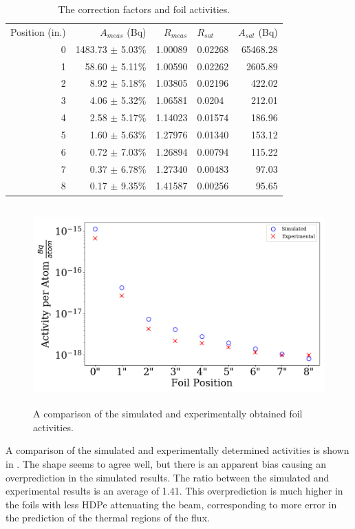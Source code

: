 \begin{table}[h]\centering
\label{tab:a_sat}
\caption{The correction factors and foil activities.}
\begin{tabular}{ r | r | r | l | r }
\toprule
Position (in.)  & $A_{meas}$ (Bq) & $R_{meas}$  & $R_{sat}$   &   $A_{sat}$  (Bq)\\
0 & 1483.73 $\pm$ 5.03\% & 1.00089 & 0.02268 & 65468.28 \\
1 & 58.60 $\pm$ 5.11\% & 1.00590 & 0.02262 &  2605.89  \\
2 & 8.92 $\pm$ 5.18\% & 1.03805 & 0.02196 &   422.02  \\
3 & 4.06 $\pm$ 5.32\% & 1.06581 & 0.0204  &   212.01  \\
4 & 2.58 $\pm$ 5.17\% & 1.14023 & 0.01574  &   186.96  \\
5 & 1.60 $\pm$ 5.63\% & 1.27976 & 0.01340 &      153.12  \\
6 & 0.72 $\pm$ 7.03\% & 1.26894 & 0.00794 &       115.22  \\
7 & 0.37 $\pm$ 6.78\% & 1.27340 & 0.00483 &      97.03   \\
8 & 0.17 $\pm$ 9.35\% & 1.41587 & 0.00256 &       95.65\\
\end{tabular}
\end{table}

\begin{figure}[htb]
\centering
\includegraphics[height=3in]{tex/figures/compare_activities.png}
\caption[Foil Activities]{A comparison of the simulated and experimentally obtained foil activities.}
\label{fig:compare_activities}
\end{figure}

A comparison of the simulated and experimentally determined activities is shown in .
The shape seems to agree well, but there is an apparent bias causing an overprediction in the simulated results.
The ratio between the simulated and experimental results is an average of 1.41.
This overprediction is much higher in the foils with less HDPe attenuating the beam, corresponding to more error in the prediction of the thermal regions of the flux.


